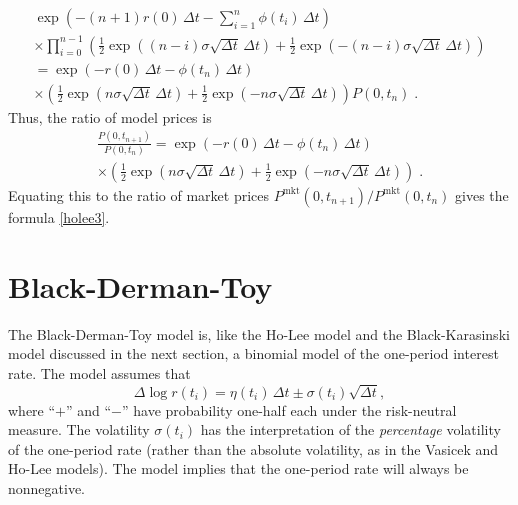 \begin{petit}
\begin{multline*}
\exp\left(-(n+1)r(0)\,\varDelta t-\sum_{i=1}^n\phi(t_i)\,\varDelta t\right)\\
\times \prod_{i=0}^{n-1} \left( \frac{1}{2} \exp\left((n-i)\sigma\sqrt{\varDelta t}\,\varDelta t\right) + \frac{1}{2} \exp\left(-(n-i)\sigma\sqrt{\varDelta t}\,\varDelta t\right)\right)
\\= \exp\left(-r(0)\,\varDelta t-\phi(t_n)\,\varDelta t\right)\\
\times \left( \frac{1}{2} \exp\left(n\sigma\sqrt{\varDelta t}\,\varDelta t\right) + \frac{1}{2} \exp\left(-n\sigma\sqrt{\varDelta t}\,\varDelta t\right)\right)P(0,t_n)\;.
\end{multline*}
Thus, the ratio of model prices is
\begin{multline*}
\frac{P(0,t_{n+1})}{P(0,t_n)} = \exp\left(-r(0)\,\varDelta t-\phi(t_n)\,\varDelta t\right)\\
\times \left( \frac{1}{2} \exp\left(n\sigma\sqrt{\varDelta t}\,\varDelta t\right) + \frac{1}{2} \exp\left(-n\sigma\sqrt{\varDelta t}\,\varDelta t\right)\right)\; .
\end{multline*}
Equating this to the ratio of market prices $P^{\text{mkt}}(0,t_{n+1})/P^{\text{mkt}}(0,t_{n})$ gives the formula \eqref{holee3}.
\end{petit}

\section{Black-Derman-Toy}

The Black-Derman-Toy \cite{BDT} model is, like the Ho-Lee model and the Black-Karasinski model discussed in the next section, a binomial model of the one-period interest rate.  The model assumes that
\begin{equation}\label{bdt1}
\varDelta \log r(t_i) = \eta(t_i)\,\varDelta t \pm \sigma(t_i)\sqrt{\varDelta t},
\end{equation}
where ``$+$'' and ``$-$'' have probability one-half each under the risk-neutral measure.
The volatility $\sigma(t_i)$ has the interpretation of the \emph{percentage} volatility of the one-period rate (rather than the absolute volatility, as in the Vasicek and Ho-Lee models).  The model implies that the one-period rate will always be nonnegative.  

